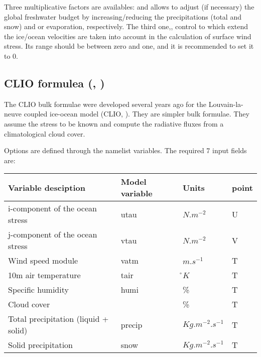 \documentclass[../tex_main/NEMO_manual]{subfiles}
\begin{document}
Three multiplicative factors are availables: 
 and  allows to adjust (if necessary) the global freshwater budget by
increasing/reducing the precipitations (total and snow) and or evaporation, respectively.
The third one,, control to which extend the ice/ocean velocities are taken into account in
the calculation of surface wind stress.
Its range should be between zero and one, and it is recommended to set it to 0.

\subsection{CLIO formulea (\protect{}, \protect{})}
\label{subsec:SBC_blk_clio}
%

The CLIO bulk formulae were developed several years ago for the Louvain-la-neuve coupled ice-ocean model
(CLIO, \cite{Goosse_al_JGR99}). 
They are simpler bulk formulae.
They assume the stress to be known and compute the radiative fluxes from a climatological cloud cover. 

Options are defined through the   namelist variables.
The required 7 input fields are:

\begin{table}[htbp]   \label{tab:CLIO}
\begin{center}
\begin{tabular}{|l|l|l|l|}
\hline
Variable desciption				& Model variable	& Units				& point \\	\hline
i-component of the ocean stress		& utau			& $N.m^{-2}$			& U \\	\hline
j-component of the ocean stress		& vtau			& $N.m^{-2}$			& V \\	\hline
Wind speed module					& vatm			& $m.s^{-1}$			& T \\	\hline
10m air temperature					& tair			& \r{}$K$				& T \\	\hline
Specific humidity						& humi			& \%					& T \\	\hline
Cloud cover							& 				& \%					& T \\	\hline
Total precipitation (liquid + solid)	& precip		& $Kg.m^{-2}.s^{-1}$	& T \\	\hline
Solid precipitation 					& snow			& $Kg.m^{-2}.s^{-1}$	& T \\	\hline
\end{tabular}
\end{center}
\end{table}
\end{document}
